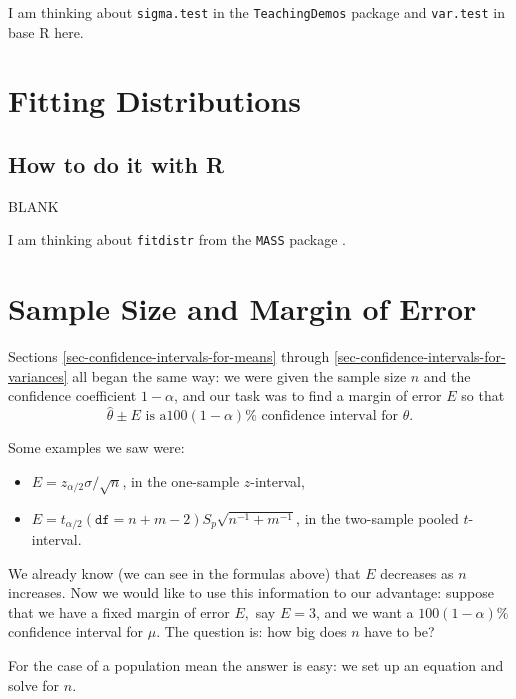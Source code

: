 \documentclass[]{book}
\providecommand{\tightlist}{%
  \setlength{\itemsep}{0pt}\setlength{\parskip}{0pt}}
\numberwithin{equation}{chapter}
\numberwithin{figure}{chapter}
\theoremstyle{plain}
\theoremstyle{definition}
\theoremstyle{remark}
\theoremstyle{definition}
\theoremstyle{definition}
\theoremstyle{remark}
\begin{document}
I am thinking about \texttt{sigma.test} in the \texttt{TeachingDemos}
package \autocite{TeachingDemos} and \texttt{var.test} in base R
\autocite{base} here.

\section{Fitting Distributions}\label{sec-fitting-distributions}

\subsection{How to do it with R}\label{how-to-do-it-with-r-37}

BLANK

I am thinking about \texttt{fitdistr} from the \texttt{MASS} package
\autocite{MASS}.

\section{Sample Size and Margin of Error}\label{sec-Sample-Size-and-moe}

Sections \ref{sec-confidence-intervals-for-means} through
\ref{sec-confidence-intervals-for-variances} all began the same way: we
were given the sample size \(n\) and the confidence coefficient
\(1-\alpha\), and our task was to find a margin of error \(E\) so that
\[ \hat{\theta}\pm E\mbox{ is a
}100(1-\alpha)\%\mbox{ confidence interval for }\theta.  \]

Some examples we saw were:

\begin{itemize}
\tightlist
\item
  \(E=z_{\alpha/2}\sigma/\sqrt{n}\), in the one-sample \(z\)-interval,
\item
  \(E=t_{\alpha/2}(\mathtt{df}=n+m-2)S_{p}\sqrt{n^{-1}+m^{-1}}\), in the
  two-sample pooled \(t\)-interval.
\end{itemize}

We already know (we can see in the formulas above) that \(E\) decreases
as \(n\) increases. Now we would like to use this information to our
advantage: suppose that we have a fixed margin of error \(E,\) say
\(E=3\), and we want a \(100(1-\alpha)\%\) confidence interval for
\(\mu\). The question is: how big does \(n\) have to be?

For the case of a population mean the answer is easy: we set up an
equation and solve for \(n\).

\bigskip
\end{document}
